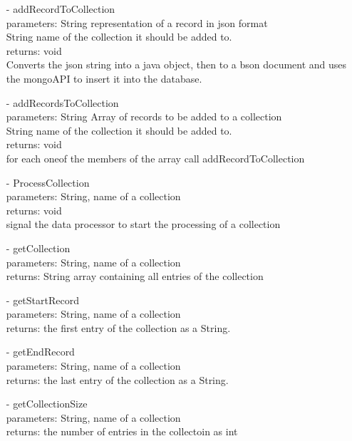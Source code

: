 \documentclass[oneside, english, final]{design}
\begin{document}
\begin{itemize}
\begin{itemize}
		      \item[-]addRecordToCollection
		            \\parameters: String representation of a record in json format
		            \\String name of the collection it should be added to.
		            \\returns: void
		            \\Converts the json string into a java object, then to a bson document and uses the mongoAPI to insert it into the database.

		      \item[-]addRecordsToCollection
		            \\parameters: String Array of records to be added to a collection
		            \\String name of the collection it should be added to.
		            \\returns: void
		            \\for each oneof the members of the array call addRecordToCollection

		      \item[-]ProcessCollection
		            \\parameters: String, name of a collection
		            \\returns: void
		            \\signal the data processor to start the processing of a collection

		      \item[-]getCollection
		            \\parameters: String, name of a collection
		            \\returns: String array containing all entries of the collection

		      \item[-]getStartRecord
		            \\parameters: String, name of a collection
		            \\returns: the first entry of the collection as a String.

		      \item[-]getEndRecord
		            \\parameters: String, name of a collection
		            \\returns: the last entry of the collection as a String.

		      \item[-]getCollectionSize
		            \\parameters: String, name of a collection
		            \\returns: the number of entries in the collectoin as int


\end{itemize}
\end{itemize}
\end{document}
